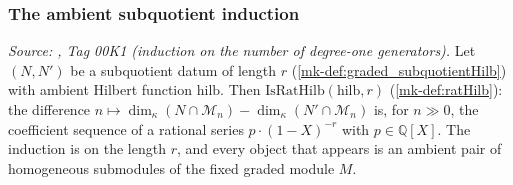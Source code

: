 \subsubsection*{The ambient subquotient induction}

\begin{lemma}\label{mk-lem:graded_subquotient_isRatHilb}
  \leanok

  \textit{Source: \cite{stacks-project}, Tag 00K1 (induction on the number of
  degree-one generators).}
  Let \((N, N')\) be a subquotient datum of length \(r\)
  (\ref{mk-def:graded_subquotientHilb}) with ambient Hilbert function
  \(\mathrm{hilb}\). Then \(\mathrm{IsRatHilb}(\mathrm{hilb}, r)\)
  (\ref{mk-def:ratHilb}): the difference \(n \mapsto \dim_\kappa(N \cap \mathcal{M}_n)
  - \dim_\kappa(N' \cap \mathcal{M}_n)\) is, for \(n \gg 0\), the coefficient
  sequence of a rational series \(p \cdot (1 - X)^{-r}\) with \(p \in
  \mathbb{Q}[X]\). The induction is on the length \(r\), and every object that
  appears is an ambient pair of homogeneous submodules of the fixed graded module
  \(M\).
\end{lemma}
